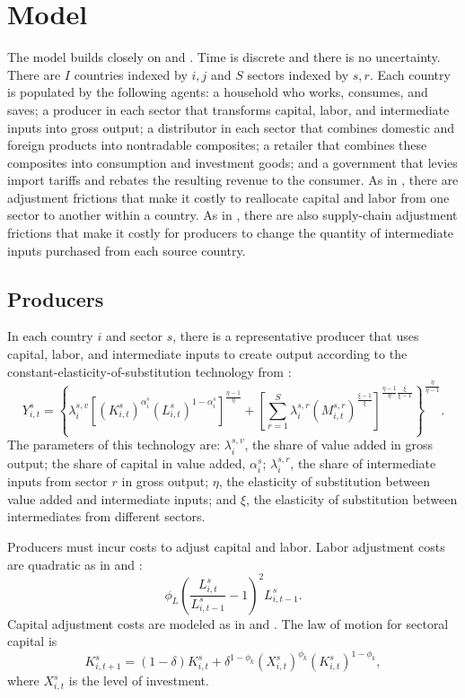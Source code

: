 \documentclass[12pt]{article}
\begin{document}
\section{Model}
The model builds closely on \citet{KRS_2018} and \citet{cje_nafta}. Time is discrete and there is no uncertainty. There are $I$ countries indexed by $i,j$ and $S$ sectors indexed by $s,r$. Each country is populated by the following agents: a household who works, consumes, and saves; a producer in each sector that transforms capital, labor, and intermediate inputs into gross output; a distributor in each sector that combines domestic and foreign products into nontradable composites; a retailer that combines these composites into consumption and investment goods; and a government that levies import tariffs and rebates the resulting revenue to the consumer. As in \citet{KR_2009}, there are adjustment frictions that make it costly to reallocate capital and labor from one sector to another within a country. As in \citet{lt_restud}, there are also supply-chain adjustment frictions that make it costly for producers to change the quantity of intermediate inputs purchased from each source country.

\subsection{Producers}
In each country $i$ and sector $s$, there is a representative producer that uses capital, labor, and intermediate inputs to create output according to the constant-elasticity-of-substitution technology from \citet{KRS_2018}:
\begin{equation}
   Y^s_{i,t}=\left\{\lambda^{s,v}_i\left[(K^s_{i,t})^{\alpha^s_i} (L^s_{i,t})^{1-\alpha^s_i}\right]^{\frac{\eta-1}{\eta}}+\left[\sum_{r=1}^S \lambda^{s,r}_i (M^{s,r}_{i,t})^{\frac{\xi-1}{\xi}}\right]^{\frac{\eta-1}{\eta}\frac{\xi}{\xi-1}}\right\}^{\frac{\eta}{\eta-1}}.
\end{equation}
The parameters of this technology are: $\lambda^{s,v}_i$, the share of value added in gross output; the share of capital in value added, $\alpha^s_i$; $\lambda^{s,r}_i$, the share of intermediate inputs from sector $r$ in gross output; $\eta$, the elasticity of substitution between value added and intermediate inputs;  and $\xi$, the elasticity of substitution between intermediates from different sectors.

Producers must incur costs to adjust capital and labor. Labor adjustment costs are quadratic as in \citet{sargent1978} and \citet{KR_2009}:
\begin{equation}
    \phi_L \left(\frac{L^s_{i,t}}{L^s_{i,t-1}}-1\right)^2 L^s_{i,t-1}.
\end{equation}
Capital adjustment costs are modeled as in \citet{lucas1971investment} and \citet{eaton2016trade}. The law of motion for sectoral capital is 
\begin{equation}
K^s_{i,t+1} = (1-\delta)K^s_{i,t}+\delta^{1-\phi_k}(X^s_{i,t})^{\phi_k} (K^s_{i,t})^{1-\phi_k},
\end{equation}
where $X^s_{i,t}$ is the level of investment.
\end{document}

